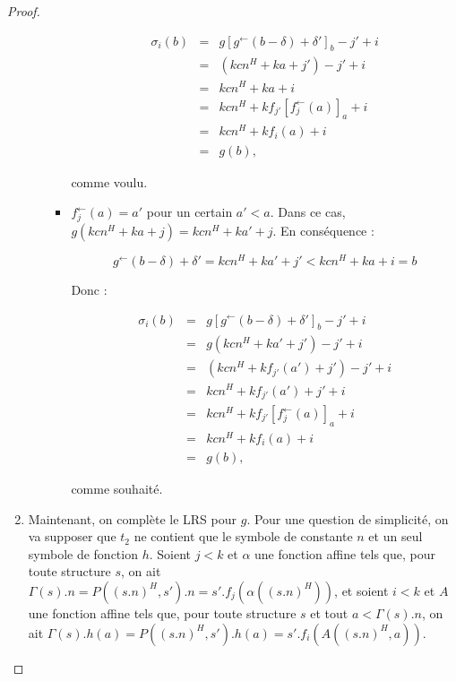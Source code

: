 \documentclass{article}
\newcommand{\eqpred}[3]{#1\left[ #2^{\leftarrow}(#3) \right]_{#3}}
\newcommand{\eqpredfi}[5]{#1\left[ #2^{\leftarrow}(#3) #4 \right]_{#5}} %
\begin{document}
\begin{proof}
\begin{enumerate}[itemsep=-1mm,leftmargin=2cm]
\begin{itemize}[itemsep=-1mm, leftmargin=1cm]
\begin{itemize}[itemsep=-1mm,leftmargin=1cm]
									\setcounter{equation}{0}
									\begin{eqnarray}
										\sigma_i(b) 	& = &	\eqpredfi{g}{g}{b-\delta}{+\delta'}{b} - j' + i \\
														& = & 	\left( kcn^H + ka + j' \right) - j' + i \\
														& = & 	kcn^H + ka + i \\
														& = & 	kcn^H + k \eqpred{f_{j'}}{f_j}{a} + i \\
														& = & 	kcn^H + k f_i(a) + i \\
														& = & 	g(b),
									\end{eqnarray}
									
									comme voulu.
									
								\item
									$f_j^{\leftarrow}(a) = a'$ pour un certain $a' < a$. Dans ce cas, $g\left( kcn^H + ka + j \right) = kcn^H + ka' + j$. En conséquence : 
									
									\[
										g^{\leftarrow}\left( b - \delta \right) + \delta' = kcn^H + ka' + j' < kcn^H + ka + i = b
									\]
									
									Donc :
									
									\setcounter{equation}{0}
									\begin{eqnarray}
										\sigma_i(b) 	& = &	\eqpredfi{g}{g}{b-\delta}{+\delta'}{b} - j' + i \\
														& = & 	g\left( kcn^H + ka' + j' \right) - j' + i \\
														& = & 	\left( kcn^H + k f_{j'}(a') + j' \right) - j' + i \\
														& = & 	kcn^H + k f_{j'}(a') + j' + i \\
														& = & 	kcn^H + k \eqpred{f_{j'}}{f_j}{a} + i \\
														& = & 	kcn^H + k f_i(a) + i \\
														& = & 	g(b),
									\end{eqnarray}
									
									comme souhaité.
							\end{itemize}
					\end{itemize}
					
					
				\item	
					Maintenant, on complète le LRS pour $g$. Pour une question de simplicité, on va supposer que $t_2$ ne contient que le symbole de constante $n$ et un seul symbole de fonction $h$. Soient $j <k$ et $\alpha$ une fonction affine tels que, pour toute structure $s$, on ait $\Gamma(s).n = P\left((s.n)^H, s'\right).n = s'.f_j\left(\alpha\left( (s.n)^H \right)\right)$, et soient $i <k$ et $A$ une fonction affine tels que, pour toute structure $s$ et tout $a < \Gamma(s).n$, on ait $\Gamma(s).h(a) = P\left((s.n)^H, s'\right).h(a) = s'.f_i\left(A\left( (s.n)^H, a \right)\right)$\footnotemark.
					

\end{enumerate}
\end{proof}
\end{document}

